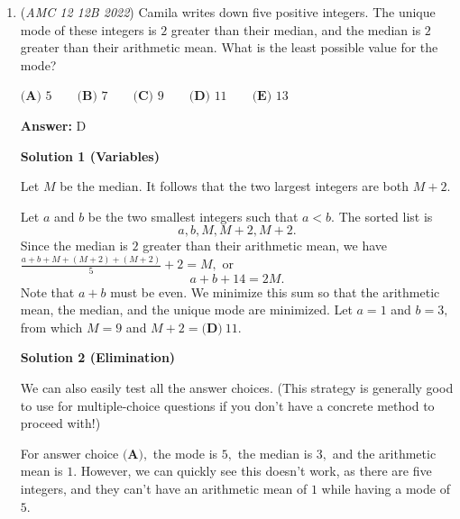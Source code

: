 \begin{enumerate}
 



\textbf{Solution 8 (Pigeonhole Principle, very fast)}

Consider any consecutive seven sets beginning on one more than a multiple of $70$. There are guaranteed to be $10$ multiples of $7$ in these seven sets. Note that no set may have three multiples of $7$. This means that some three of the ten sets have $2$ multiples of seven. There are $14$ such groups of seven sets, and then the sets $\{981, 982, \dots, 989\}$ and $\{991, 992, \dots, \}$. These last two sets are congruent to $\{1, 2, \dots, 9\}$ and $\{11, 12, \dots, 19\}$ modulo 7, thus making it easy to check that each only has one multiple of $7$. Therefore, there are $14 \cdot 3 = \boxed{\textbf{(D) }42}$ sets with $2$ multiples of $7$. 

 


	\item (\textit{AMC 12 12B 2022}) Camila writes down five positive integers. The unique mode of these integers is $2$ greater than their median, and the median is $2$ greater than their arithmetic mean. What is the least possible value for the mode?


 $\textbf{(A) }5\qquad\textbf{(B) }7\qquad\textbf{(C) }9\qquad\textbf{(D) }11\qquad\textbf{(E) }13$

 \textbf{Answer: }D



\textbf{Solution 1 (Variables)}

Let $M$ be the median. It follows that the two largest integers are both $M+2.$

 Let $a$ and $b$ be the two smallest integers such that $a<b.$ The sorted list is 
 \[a,b,M,M+2,M+2.\]Since the median is $2$ greater than their arithmetic mean, we have $\frac{a+b+M+(M+2)+(M+2)}{5}+2=M,$ or 
 \[a+b+14=2M.\]Note that $a+b$ must be even. We minimize this sum so that the arithmetic mean, the median, and the unique mode are minimized. Let $a=1$ and $b=3,$ from which $M=9$ and $M+2=\boxed{\textbf{(D)}\ 11}.$




\textbf{Solution 2 (Elimination)}

We can also easily test all the answer choices. (This strategy is generally good to use for multiple-choice questions if you don't have a concrete method to proceed with!)

 For answer choice $\textbf{(A)},$ the mode is $5,$ the median is $3,$ and the arithmetic mean is $1.$ However, we can quickly see this doesn't work, as there are five integers, and they can't have an arithmetic mean of $1$ while having a mode of $5.$ 


\end{enumerate}
